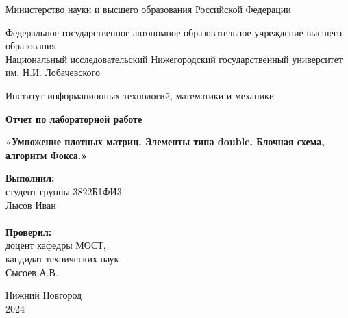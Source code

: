\documentclass{report}
\begin{document}
	
	\begin{titlepage}
		
		\begin{center}
			Министерство науки и высшего образования Российской Федерации
		\end{center}
		
		\begin{center}
			Федеральное государственное автономное образовательное учреждение высшего образования \\
			Национальный исследовательский Нижегородский государственный университет им. Н.И. Лобачевского
		\end{center}
		
		\begin{center}
			Институт информационных технологий, математики и механики
		\end{center}
		
		\vspace{4em}
		
		\begin{center}
			\textbf{\Large Отчет по лабораторной работе} \\
		\end{center}
		\begin{center}
			\textbf{\Large «Умножение плотных матриц. Элементы типа double. Блочная схема, алгоритм Фокса.»} \\
		\end{center}
		
		\vspace{4em}
		
		\newbox{\lbox}
		\newlength{\maxl}
		\setlength{\maxl}{\wd\lbox}
		\hfill\parbox{7cm}{
			\hspace*{5cm}\hspace*{-5cm}\textbf{Выполнил:} \\ студент группы 3822Б1ФИ3 \\ Лысов Иван\\
			\\
			\hspace*{5cm}\hspace*{-5cm}\textbf{Проверил:}\\ доцент кафедры МОСТ, \\ кандидат технических наук \\ Сысоев А.В.\\}
		\vspace{\fill}
		
		\begin{center} Нижний Новгород \\ 2024 \end{center}
		
	\end{titlepage}
	
\end{document}
